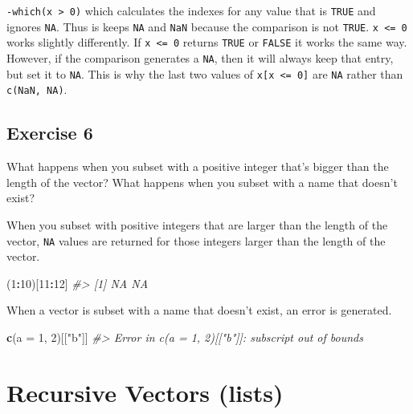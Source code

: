 \documentclass[]{book}
\newenvironment{Shaded}{\begin{snugshade}}{\end{snugshade}}
\newcommand{\CommentTok}[1]{\textcolor[rgb]{0.56,0.35,0.01}{\textit{#1}}}
\newcommand{\DataTypeTok}[1]{\textcolor[rgb]{0.13,0.29,0.53}{#1}}
\newcommand{\DecValTok}[1]{\textcolor[rgb]{0.00,0.00,0.81}{#1}}
\newcommand{\KeywordTok}[1]{\textcolor[rgb]{0.13,0.29,0.53}{\textbf{#1}}}
\newcommand{\NormalTok}[1]{#1}
\newcommand{\OperatorTok}[1]{\textcolor[rgb]{0.81,0.36,0.00}{\textbf{#1}}}
\newcommand{\StringTok}[1]{\textcolor[rgb]{0.31,0.60,0.02}{#1}}
\theoremstyle{definition}
\theoremstyle{definition}
\theoremstyle{definition}
\theoremstyle{remark}
\begin{document}
\texttt{-which(x\ \textgreater{}\ 0)} which calculates the indexes for
any value that is \texttt{TRUE} and ignores \texttt{NA}. Thus is keeps
\texttt{NA} and \texttt{NaN} because the comparison is not
\texttt{TRUE}. \texttt{x\ \textless{}=\ 0} works slightly differently.
If \texttt{x\ \textless{}=\ 0} returns \texttt{TRUE} or \texttt{FALSE}
it works the same way. However, if the comparison generates a
\texttt{NA}, then it will always keep that entry, but set it to
\texttt{NA}. This is why the last two values of
\texttt{x{[}x\ \textless{}=\ 0{]}} are \texttt{NA} rather than
\texttt{c(NaN,\ NA)}.

\hypertarget{exercise-6-11}{%
\subsection{Exercise 6}\label{exercise-6-11}}

What happens when you subset with a positive integer that's bigger than
the length of the vector? What happens when you subset with a name that
doesn't exist?

When you subset with positive integers that are larger than the length
of the vector, \texttt{NA} values are returned for those integers larger
than the length of the vector.

\begin{Shaded}
\begin{Highlighting}[]
\NormalTok{(}\DecValTok{1}\OperatorTok{:}\DecValTok{10}\NormalTok{)[}\DecValTok{11}\OperatorTok{:}\DecValTok{12}\NormalTok{]}
\CommentTok{#> [1] NA NA}
\end{Highlighting}
\end{Shaded}

When a vector is subset with a name that doesn't exist, an error is
generated.

\begin{Shaded}
\begin{Highlighting}[]
\KeywordTok{c}\NormalTok{(}\DataTypeTok{a =} \DecValTok{1}\NormalTok{, }\DecValTok{2}\NormalTok{)[[}\StringTok{"b"}\NormalTok{]]}
\CommentTok{#> Error in c(a = 1, 2)[["b"]]: subscript out of bounds}
\end{Highlighting}
\end{Shaded}

\hypertarget{recursive-vectors-lists}{%
\section{Recursive Vectors (lists)}\label{recursive-vectors-lists}}
\end{document}
